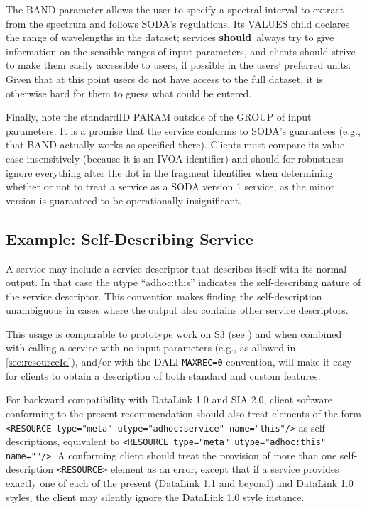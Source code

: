 \documentclass[11pt,a4paper]{ivoa}
\newcommand{\rfcshould}{\textbf{should}}
\begin{document}
The BAND parameter allows the user to specify a spectral interval to
extract from the spectrum and follows SODA's regulations.  Its VALUES
child declares the range of wavelengths in the dataset; services \rfcshould\
always try to give information on the sensible ranges of input
parameters, and clients should strive to make them easily accessible to
users, if possible in the users' preferred units.  Given that at this
point users do not have access to the full dataset, it is otherwise hard
for them to guess what could be entered.

Finally, note the standardID PARAM outside of the GROUP of input
parameters.  It is a promise that the service conforms to SODA's
guarantees (e.g., that BAND actually works as specified there).  Clients
must compare its value case-insensitively (because it is an IVOA
identifier) and should for robustness ignore everything after the dot in
the fragment identifier when determining whether or not to treat a
service as a SODA version 1 service, as the minor version is guaranteed
to be operationally insignificant.


\subsection{Example: Self-Describing Service}
\label{sec:selfDescribing}

A service may include a service descriptor that describes itself with
its normal output.
In that case the utype ``adhoc:this'' indicates the self-describing
nature of the service descriptor.
This convention makes finding the self-description unambiguous in
cases where the output also contains other service descriptors.

This usage is comparable to prototype work on S3
(see \citet{note:s3})
and when combined with calling a service with no input parameters
(e.g., as allowed in \ref{sec:resourceId}),
and/or with the DALI \texttt{MAXREC=0} convention,
will make it easy for clients to obtain a
description of both standard and custom features.

For backward compatibility with DataLink 1.0 and SIA 2.0, client software
conforming to the present recommendation should also treat elements of
the form \verb|<RESOURCE type="meta" utype="adhoc:service" name="this"/>|
as self-descriptions, equivalent to
\verb|<RESOURCE type="meta" utype="adhoc:this" name=""/>|.
A conforming client should treat the provision of more than one
self-description \texttt{<RESOURCE>} element as an error, except that if a
service provides exactly one of each of the present (DataLink 1.1 and
beyond) and DataLink 1.0 styles, the client may silently ignore the
DataLink 1.0 style instance.
\end{document}
